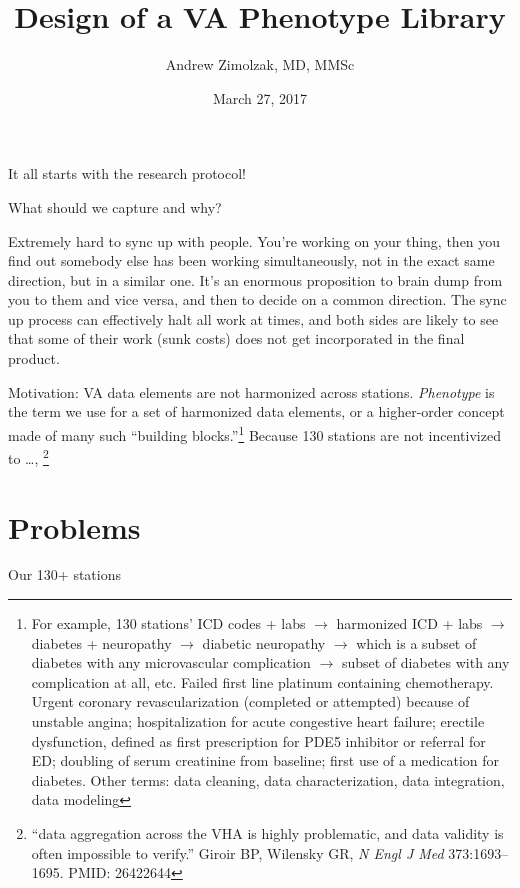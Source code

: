 \documentclass{tufte-handout}
\title{Design of a VA Phenotype Library}
\author{Andrew Zimolzak, MD, MMSc}
\date{March 27, 2017}
\begin{document}
\maketitle

It all starts with the research protocol!

What should we capture and why?

Extremely hard to sync up with people. You're working on your thing,
then you find out somebody else has been working simultaneously, not
in the exact same direction, but in a similar one. It's an enormous
proposition to brain dump from you to them and vice versa, and then to
decide on a common direction. The sync up process can effectively halt
all work at times, and both sides are likely to see that some of their
work (sunk costs) does not get incorporated in the final product.

Motivation: VA data elements are not harmonized across stations.
\emph{Phenotype} is the term we use for a set of harmonized data
elements, or a higher-order concept made of many such ``building
blocks.''\footnote{For example, 130 stations' ICD codes + labs $\to$
  harmonized ICD + labs $\to$ diabetes + neuropathy $\to$ diabetic
  neuropathy $\to$ which is a subset of diabetes with any
  microvascular complication $\to$ subset of diabetes with any
  complication at all, etc. Failed first line platinum containing
  chemotherapy. Urgent coronary revascularization (completed or
  attempted) because of unstable angina; hospitalization for acute
  congestive heart failure; erectile dysfunction, defined as first
  prescription for PDE5 inhibitor or referral for ED; doubling of
  serum creatinine from baseline; first use of a medication for
  diabetes. Other terms: data cleaning, data characterization, data
  integration, data modeling} Because 130 stations are not
incentivized to \ldots{}, %
\footnote{``data aggregation across the
VHA is highly problematic, and data validity is often impossible to
verify.'' Giroir BP, Wilensky GR, \emph{N Engl J Med}
  373:1693--1695. PMID: 26422644}

\section{Problems}

Our 130+ stations %
\end{document}
